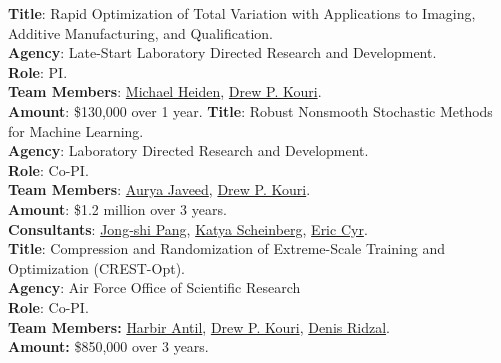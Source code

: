 \documentclass[11pt, a4paper]{article}
\newcommand{\years}[1]{\marginnote{#1}}
\begin{document}
\years{2024} \textbf{Title}: Rapid Optimization of Total Variation with Applications to Imaging, Additive Manufacturing, and Qualification. \\
\textbf{Agency}: Late-Start Laboratory Directed Research and Development.\\
\textbf{Role}: PI. \\
\textbf{Team Members}: \href{https://www.sandia.gov/research/publications/search/?sort=date&format=citation&authors%5B0%5D=michael-heiden}{Michael Heiden}, \href{https://cfwebprod.sandia.gov/cfdocs/CompResearch/templates/insert/profile.cfm?dpkouri}{Drew P. Kouri}.\\
\textbf{Amount}: \$130,000 over 1 year.
\noindent
\years{2023}\textbf{Title}: Robust Nonsmooth Stochastic Methods for Machine Learning.\\
\textbf{Agency}: Laboratory Directed Research and Development.\\
\textbf{Role}: Co-PI. \\
\textbf{Team Members}: \href{https://rol.sandia.gov/team/}{Aurya Javeed},
\href{https://cfwebprod.sandia.gov/cfdocs/CompResearch/templates/insert/profile.cfm?dpkouri}{Drew P. Kouri}.\\
\textbf{Amount}: \$1.2 million over 3 years.\\
\textbf{Consultants}: \href{https://viterbi.usc.edu/directory/faculty/Pang/Jong-Shi}{Jong-shi Pang}, \href{https://www.orie.cornell.edu/faculty-directory/katya-scheinberg}{Katya Scheinberg}, \href{https://www.sandia.gov/ccr/staff/eric-christopher-cyr/}{Eric Cyr}.\\
\noindent
\years{2022} \textbf{Title}: Compression and Randomization of Extreme-Scale Training and Optimization (CREST-Opt).\\
\textbf{Agency}: Air Force Office of Scientific Research\\
\textbf{Role}: Co-PI.\\
 \textbf{Team Members:}
\href{https://math.gmu.edu/~hantil/}{Harbir Antil},
\href{https://cfwebprod.sandia.gov/cfdocs/CompResearch/templates/insert/profile.cfm?dpkouri}{Drew P. Kouri},
\href{https://cfwebprod.sandia.gov/cfdocs/CompResearch/templates/insert/profile.cfm?dridzal}{Denis Ridzal}.\\
 \textbf{Amount:} \$850,000 over 3 years.\\
\end{document}
